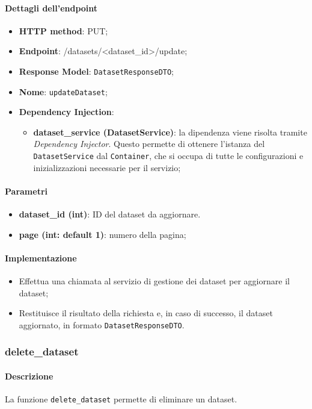 \paragraph{Dettagli dell'endpoint}
\begin{itemize}
    \item \textbf{HTTP method}: PUT;
    \item \textbf{Endpoint}: /datasets/\textless dataset\_id\textgreater/update;
    \item \textbf{Response Model}: \texttt{DatasetResponseDTO};
    \item \textbf{Nome}: \texttt{updateDataset};
    \item \textbf{Dependency Injection}: 
    \begin{itemize}
        \item \textbf{dataset\_service (DatasetService)}: la dipendenza viene risolta tramite \textit{Dependency Injector}. Questo permette di ottenere l'istanza del \texttt{DatasetService} dal \texttt{Container}, che si occupa di tutte le configurazioni e inizializzazioni necessarie per il servizio;
    \end{itemize}
\end{itemize}
\paragraph{Parametri}
\begin{itemize}
    \item \textbf{dataset\_id (int)}: ID del dataset da aggiornare.
    \item \textbf{page (int: default 1)}: numero della pagina;
\end{itemize}
\paragraph{Implementazione}
\begin{itemize}
    \item Effettua una chiamata al servizio di gestione dei dataset per aggiornare il dataset;
    \item Restituisce il risultato della richiesta e, in caso di successo, il dataset aggiornato, in formato \texttt{DatasetResponseDTO}.
\end{itemize}

\subsubsection{delete\_dataset}
\paragraph{Descrizione}
La funzione \texttt{delete\_dataset} permette di eliminare un dataset.
